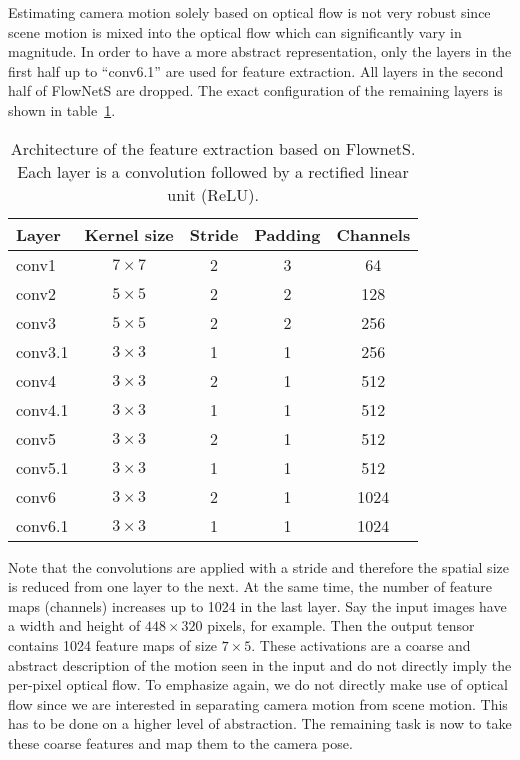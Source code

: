 			Estimating camera motion solely based on optical flow is not very robust since scene motion is mixed into the optical flow which can significantly vary in magnitude.
			In order to have a more abstract representation, only the layers in the first half up to ``conv6.1'' are used for feature extraction.
			All layers in the second half of FlowNetS are dropped.
			The exact configuration of the remaining layers is shown in table~\ref{tbl:first_part_of_flownets}.
			\begin{table}[tb]
				\small
				\begin{center}
					\begin{tabular}{lcccc}
						\toprule
						Layer 		& Kernel size 		& Stride 		& Padding 		& Channels 		\\
						\midrule
						conv1 		& $7 \times 7$		& 2 			& 3 			& 64 			\\
						conv2 		& $5 \times 5$		& 2 			& 2 			& 128 			\\
						conv3 		& $5 \times 5$		& 2 			& 2 			& 256			\\
						conv3.1 	& $3 \times 3$		& 1 			& 1 			& 256 			\\
						conv4 		& $3 \times 3$		& 2 			& 1 			& 512 			\\
						conv4.1 	& $3 \times 3$		& 1 			& 1 			& 512 			\\
						conv5 		& $3 \times 3$		& 2 			& 1 			& 512 			\\
						conv5.1 	& $3 \times 3$		& 1 			& 1 			& 512 			\\
						conv6 		& $3 \times 3$		& 2 			& 1 			& 1024 			\\
						conv6.1 	& $3 \times 3$		& 1 			& 1 			& 1024 			\\
						\bottomrule
					\end{tabular}
				\end{center}
				\caption[Architecture of the feature extraction based on FlownetS]
						{Architecture of the feature extraction based on FlownetS. 
						 Each layer is a convolution followed by a rectified linear unit (ReLU).
						 \label{tbl:first_part_of_flownets}}
			\end{table}
			Note that the convolutions are applied with a stride and therefore the spatial size is reduced from one layer to the next.
			At the same time, the number of feature maps (channels) increases up to 1024 in the last layer.
			Say the input images have a width and height of $448 \times 320$ pixels, for example. 
			Then the output tensor contains 1024 feature maps of size $7 \times 5$.
			These activations are a coarse and abstract description of the motion seen in the input and do not directly imply the per-pixel optical flow.
			To emphasize again, we do not directly make use of optical flow since we are interested in separating camera motion from scene motion.
			This has to be done on a higher level of abstraction.
			The remaining task is now to take these coarse features and map them to the camera pose. 
			
